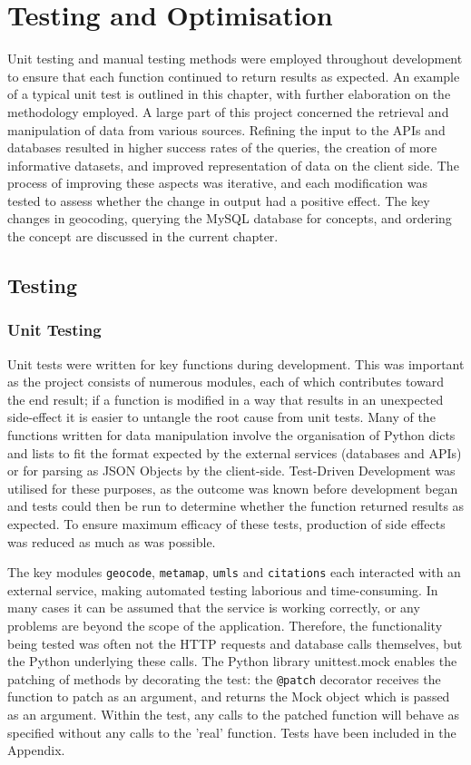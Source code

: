 \documentclass[Report.tex]{subfiles}
\begin{document}
\chapter{Testing and Optimisation}
Unit testing and manual testing methods were employed throughout development to ensure that each function continued to return results as expected. An example of a typical unit test is outlined in this chapter, with further elaboration on the methodology employed. A large part of this project concerned the retrieval and manipulation of data from various sources. Refining the input to the APIs and databases resulted in higher success rates of the queries, the creation of more informative datasets, and improved representation of data on the client side. The process of improving these aspects was iterative, and each modification was tested to assess whether the change in output had a positive effect. The key changes in geocoding, querying the MySQL database for concepts, and ordering the concept are discussed in the current chapter.

\section{Testing}
\subsection{Unit Testing}
Unit tests were written for key functions during development. This was important as the project consists of numerous modules, each of which contributes toward the end result; if a function is modified in a way that results in an unexpected side-effect it is easier to untangle the root cause from unit tests. Many of the functions written for data manipulation involve the organisation of Python dicts and lists to fit the format expected by the external services (databases and APIs) or for parsing as JSON Objects by the client-side. Test-Driven Development was utilised for these purposes, as the outcome was known before development began and tests could then be run to determine whether the function returned results as expected. To ensure maximum efficacy of these tests, production of side effects was reduced as much as was possible. \newline

\noindent The key modules \texttt{geocode}, \texttt{metamap}, \texttt{umls} and \texttt{citations} each interacted with an external service, making automated testing laborious and time-consuming. In many cases it can be assumed that the service is working correctly, or any problems are beyond the scope of the application. Therefore, the functionality being tested was often not the HTTP requests and database calls themselves, but the Python underlying these calls. The Python library unittest.mock enables the patching of methods by decorating the test: the \texttt{@patch} decorator receives the function to patch as an argument, and returns the Mock object which is passed as an argument. Within the test, any calls to the patched function will behave as specified without any calls to the 'real' function. Tests have been included in the Appendix.
\end{document}
